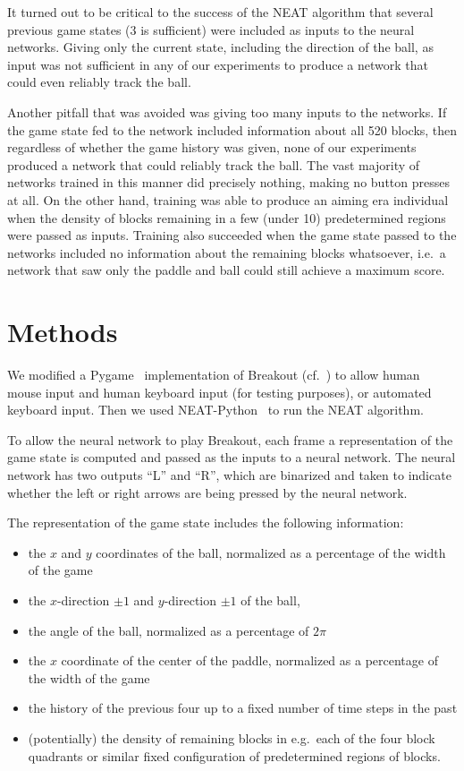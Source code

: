 \documentclass[letterpaper, twocolumn, conference]{article}
\begin{document}
It turned out to be critical to the success of the NEAT algorithm that several previous game states (3 is sufficient) were included as inputs to the neural networks.
Giving only the current state, including the direction of the ball, as input was not sufficient in any
of our experiments to produce a network that could even reliably track the ball.

Another pitfall that was avoided was giving too many inputs to the networks.
If the game state fed to the network
included information about all 520 blocks, then regardless of whether the game history was given,
none of our experiments produced a network that could reliably track the ball.
The vast majority of networks trained in this manner did precisely nothing, making no button presses
at all.
On the other hand, training was able to produce an aiming era individual
when the density of blocks remaining in a few (under 10) predetermined regions were passed as inputs.
Training also succeeded when the game state passed to the networks included no information about the remaining blocks whatsoever, i.e.\ a network that saw only the paddle and ball could still achieve a maximum score.

\section{Methods}
We modified a Pygame~\cite{pygame} implementation of Breakout (cf.~\cite{max00355breakout}) to allow
human mouse input and human keyboard input (for testing purposes), or automated keyboard input.
Then we used NEAT-Python~\cite{neatpython} to run the NEAT algorithm.

To allow the neural network to play Breakout,
each frame a representation of the game state is computed and
passed as the inputs to a neural network.
The neural network has two outputs ``L'' and ``R'', which are binarized
and taken to indicate whether the left or right arrows are being pressed by the neural network.

The representation of the game state includes the following information:
\begin{itemize}
    \item{} the $x$ and $y$ coordinates of the ball, normalized as a percentage of the width of the game
    \item{} the $x$-direction $\pm1$ and $y$-direction $\pm 1$ of the ball,
    \item{} the angle of the ball, normalized as a percentage of $2\pi$
    \item{} the $x$ coordinate of the center of the paddle, normalized as a percentage of the width of the game
    \item{} the history of the previous four up to a fixed number of time steps in the past
    \item{} (potentially) the density of remaining blocks in e.g.\ each of the four block quadrants or similar fixed configuration of predetermined regions of blocks.
\end{itemize}
\end{document}
